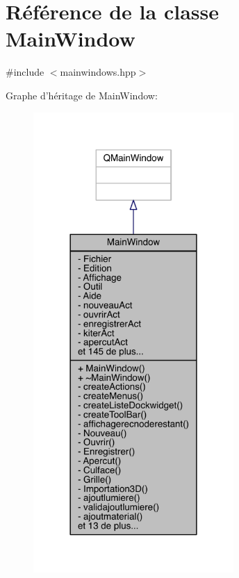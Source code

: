 \hypertarget{class_main_window}{\section{Référence de la classe Main\+Window}
\label{class_main_window}
}


{\ttfamily \#include $<$mainwindows.\+hpp$>$}



Graphe d'héritage de Main\+Window\+:
\nopagebreak
\begin{figure}[H]
\begin{center}
\leavevmode
\includegraphics[width=216pt]{class_main_window__inherit__graph}
\end{center}
\end{figure}


